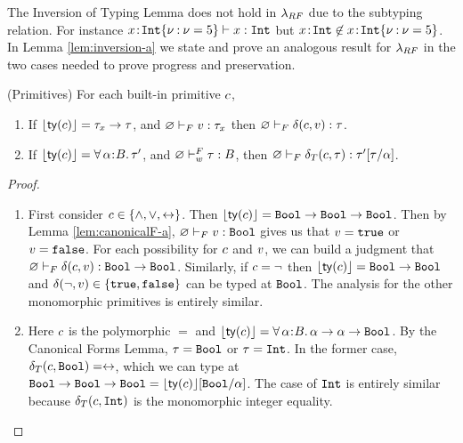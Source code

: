 The Inversion of Typing Lemma does not hold in $\lambda_{RF}$ due to the subtyping
relation. For instance 
${{{x}\!:\!{{{\texttt{Int}}\{\nu \mathbin{:} \nu = 5\}}}}} \vdash {x} : {\texttt{Int}}$ but
${{x}\!:\!{\texttt{Int}}} \not \in {\ensuremath{{{x}\!:\!{{{\texttt{Int}}\{\nu \mathbin{:} \nu = 5\}}}}}}$.
In Lemma \ref{lem:inversion-a} we state and prove an analogous result 
for $\lambda_{RF}$ in the two cases needed to prove progress and preservation.
\begin{lemma}\label{lem:primitivesF-a}(Primitives) 
For each built-in primitive $c$, 
%
\begin{enumerate}
\item If $\lfloor{{\mathsf{ty}}(\ensuremath{c})}\rfloor = \tau_x \rightarrow \tau$, 
        and ${\varnothing} \vdash_F {v} : {\tau_x}$ 
        then %
        ${\varnothing} \vdash_F {\delta(c,v)} : {\tau}$.
\item If $\lfloor{{\mathsf{ty}}(\ensuremath{c})}\rfloor = \forall\, \alpha\hspace{0.05em}{:}\hspace{0.05em} B.\, \tau'$, 
        and ${\varnothing} \vdash_w^F {\tau} : {B}$, 
        then %
        ${\varnothing} \vdash_F {\delta_T(c,\tau)} : {{\tau'}[\tau/\alpha]}$.
\end{enumerate}
\end{lemma}
\begin{proof}
\begin{enumerate}
    \item First consider $c \in \{\wedge, \vee, \leftrightarrow\}$. 
        Then $\lfloor{{\mathsf{ty}}(\ensuremath{c})}\rfloor = \texttt{Bool} \rightarrow \texttt{Bool} \rightarrow \texttt{Bool}$.
        Then by Lemma \ref{lem:canonicalF-a}, ${\varnothing} \vdash_F {v} : {\texttt{Bool}}$
        gives us that $v = \mathtt{true}$ or $v = \mathtt{false}$.
        For each possibility for $c$ and $v$, we can build a judgment 
        that ${\varnothing} \vdash_F {\delta(c,v)} : {\texttt{Bool} \rightarrow \texttt{Bool}}$.
        Similarly, if $c = \neg$ 
        then $\lfloor{{\mathsf{ty}}(\ensuremath{c})}\rfloor = \texttt{Bool} \rightarrow \texttt{Bool}$ and 
        $\delta(\neg,v) \in \{\mathtt{true},\mathtt{false}\}$ can be typed at $\texttt{Bool}$.
        The analysis for the other monomorphic primitives is entirely similar.
    \item Here $c$ is the polymorphic $=$ and 
        $\lfloor{{\mathsf{ty}}(\ensuremath{c})}\rfloor = \forall\, \alpha\hspace{0.05em}{:}\hspace{0.05em} B.\, \alpha \rightarrow \alpha \rightarrow \texttt{Bool}$. By the Canonical Forms Lemma, 
        $\tau = \texttt{Bool}$ or $\tau = \texttt{Int}$. In the former case,
        $\delta_T(c,\texttt{Bool}) = \leftrightarrow$, which we can type at 
        $\texttt{Bool} \rightarrow \texttt{Bool} \rightarrow \texttt{Bool} ={\lfloor{{\mathsf{ty}}(\ensuremath{c})}\rfloor}[\texttt{Bool}/\alpha]$. The case of $\texttt{Int}$ is entirely similar
        because $\delta_T(c,\texttt{Int})$ is the monomorphic integer equality.
\end{enumerate}
\end{proof}
